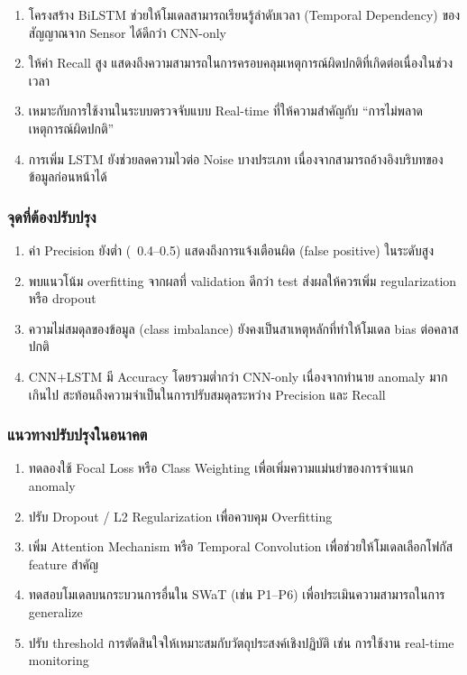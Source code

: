 \begin{enumerate}
    \item โครงสร้าง BiLSTM ช่วยให้โมเดลสามารถเรียนรู้ลำดับเวลา (Temporal Dependency) ของสัญญาณจาก Sensor ได้ดีกว่า CNN-only
    \item ให้ค่า Recall สูง แสดงถึงความสามารถในการครอบคลุมเหตุการณ์ผิดปกติที่เกิดต่อเนื่องในช่วงเวลา
    \item เหมาะกับการใช้งานในระบบตรวจจับแบบ Real-time ที่ให้ความสำคัญกับ “การไม่พลาดเหตุการณ์ผิดปกติ”
    \item การเพิ่ม LSTM ยังช่วยลดความไวต่อ Noise บางประเภท เนื่องจากสามารถอ้างอิงบริบทของข้อมูลก่อนหน้าได้
\end{enumerate}

\subsubsection{จุดที่ต้องปรับปรุง}

\begin{enumerate}
    \item ค่า Precision ยังต่ำ (~0.4–0.5) แสดงถึงการแจ้งเตือนผิด (false positive) ในระดับสูง
    \item พบแนวโน้ม overfitting จากผลที่ validation ดีกว่า test ส่งผลให้ควรเพิ่ม regularization หรือ dropout
    \item ความไม่สมดุลของข้อมูล (class imbalance) ยังคงเป็นสาเหตุหลักที่ทำให้โมเดล bias ต่อคลาสปกติ
    \item CNN+LSTM มี Accuracy โดยรวมต่ำกว่า CNN-only เนื่องจากทำนาย anomaly มากเกินไป สะท้อนถึงความจำเป็นในการปรับสมดุลระหว่าง Precision และ Recall
\end{enumerate}

\subsubsection{แนวทางปรับปรุงในอนาคต}

\begin{enumerate}
    \item ทดลองใช้ Focal Loss หรือ Class Weighting เพื่อเพิ่มความแม่นยำของการจำแนก anomaly
    \item ปรับ Dropout / L2 Regularization เพื่อควบคุม Overfitting
    \item เพิ่ม Attention Mechanism หรือ Temporal Convolution เพื่อช่วยให้โมเดลเลือกโฟกัส feature สำคัญ
    \item ทดสอบโมเดลบนกระบวนการอื่นใน SWaT (เช่น P1–P6) เพื่อประเมินความสามารถในการ generalize
    \item ปรับ threshold การตัดสินใจให้เหมาะสมกับวัตถุประสงค์เชิงปฏิบัติ เช่น การใช้งาน real-time monitoring
\end{enumerate}